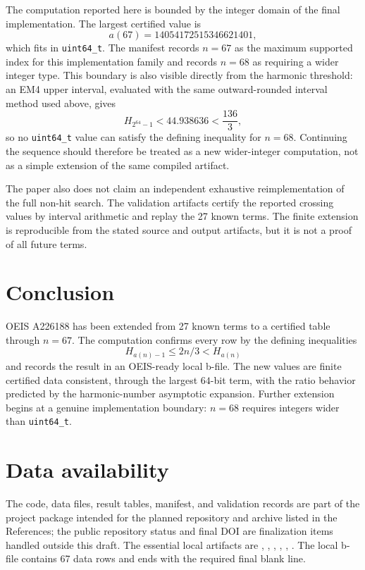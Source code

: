 \documentclass[11pt]{article}
\theoremstyle{definition}
\theoremstyle{remark}
\begin{document}
The computation reported here is bounded by the integer domain of the final
implementation.  The largest certified value is
\[
  a(67)=14054172515346621401,
\]
which fits in \texttt{uint64\_t}.  The manifest records \(n=67\) as the maximum
supported index for this implementation family and records \(n=68\) as
requiring a wider integer type.  This boundary is also visible directly from
the harmonic threshold: an EM4 upper interval, evaluated with the same
outward-rounded interval method used above, gives
\[
  H_{2^{64}-1}<44.938636<\frac{136}{3},
\]
so no \texttt{uint64\_t} value can satisfy the defining inequality for
\(n=68\).  Continuing the sequence should therefore be treated as a new
wider-integer computation, not as a simple extension of the same compiled
artifact.

The paper also does not claim an independent exhaustive reimplementation of the
full non-hit search.  The validation artifacts certify the reported crossing
values by interval arithmetic and replay the 27 known terms.  The finite
extension is reproducible from the stated source and output artifacts, but it
is not a proof of all future terms.

\section{Conclusion}

OEIS A226188 has been extended from 27 known terms to a certified table through
\(n=67\).  The computation confirms every row by the defining inequalities
\[
  H_{a(n)-1}\leq 2n/3 < H_{a(n)}
\]
and records the result in an OEIS-ready local b-file.  The new values are
finite certified data consistent, through the largest \(64\)-bit term, with the
ratio behavior predicted by the harmonic-number asymptotic expansion.  Further
extension begins at a genuine implementation boundary: \(n=68\) requires
integers wider than \texttt{uint64\_t}.

\section*{Data availability}

The code, data files, result tables, manifest, and validation records are part
of the project package intended for the planned repository and archive listed
in the References; the public repository status and final DOI are finalization
items handled outside this draft.  The essential local artifacts are
, , ,
, ,
.  The local b-file contains 67 data rows
and ends with the required final blank line.
\end{document}
